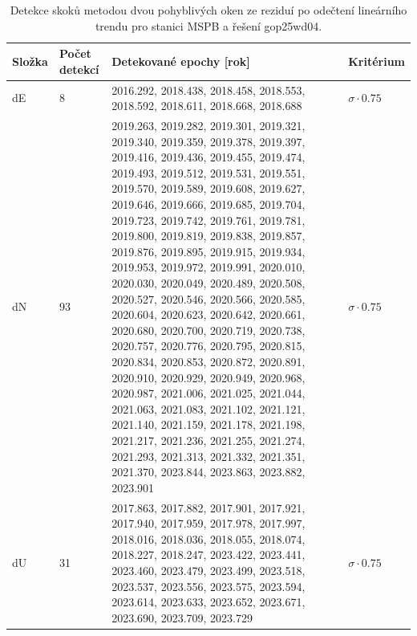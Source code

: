 \begin{table}[htbp]
\caption{Detekce skoků metodou dvou pohyblivých oken ze reziduí po odečtení lineárního trendu pro stanici MSPB a řešení gop25wd04.}
\label{tab:gop25wd04_stcd_mspb_detr_weighted_1seg_jumps_sliding_window}
\begin{tabular}{llll}
\toprule
Složka & Počet detekcí & Detekované epochy [rok] & Kritérium \\
\midrule
dE & 8 & 2016.292, 2018.438, 2018.458, 2018.553, 2018.592, 2018.611, 2018.668, 2018.688 & $\sigma \cdot 0.75$ \\
dN & 93 & 2019.263, 2019.282, 2019.301, 2019.321, 2019.340, 2019.359, 2019.378, 2019.397, 2019.416, 2019.436, 2019.455, 2019.474, 2019.493, 2019.512, 2019.531, 2019.551, 2019.570, 2019.589, 2019.608, 2019.627, 2019.646, 2019.666, 2019.685, 2019.704, 2019.723, 2019.742, 2019.761, 2019.781, 2019.800, 2019.819, 2019.838, 2019.857, 2019.876, 2019.895, 2019.915, 2019.934, 2019.953, 2019.972, 2019.991, 2020.010, 2020.030, 2020.049, 2020.489, 2020.508, 2020.527, 2020.546, 2020.566, 2020.585, 2020.604, 2020.623, 2020.642, 2020.661, 2020.680, 2020.700, 2020.719, 2020.738, 2020.757, 2020.776, 2020.795, 2020.815, 2020.834, 2020.853, 2020.872, 2020.891, 2020.910, 2020.929, 2020.949, 2020.968, 2020.987, 2021.006, 2021.025, 2021.044, 2021.063, 2021.083, 2021.102, 2021.121, 2021.140, 2021.159, 2021.178, 2021.198, 2021.217, 2021.236, 2021.255, 2021.274, 2021.293, 2021.313, 2021.332, 2021.351, 2021.370, 2023.844, 2023.863, 2023.882, 2023.901 & $\sigma \cdot 0.75$ \\
dU & 31 & 2017.863, 2017.882, 2017.901, 2017.921, 2017.940, 2017.959, 2017.978, 2017.997, 2018.016, 2018.036, 2018.055, 2018.074, 2018.227, 2018.247, 2023.422, 2023.441, 2023.460, 2023.479, 2023.499, 2023.518, 2023.537, 2023.556, 2023.575, 2023.594, 2023.614, 2023.633, 2023.652, 2023.671, 2023.690, 2023.709, 2023.729 & $\sigma \cdot 0.75$ \\
\bottomrule
\end{tabular}
\end{table}
